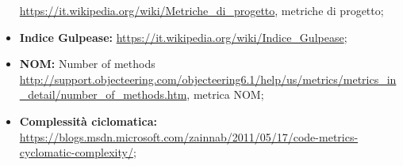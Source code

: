 \begin{itemize}
				  \url{https://it.wikipedia.org/wiki/Metriche_di_progetto}, metriche di progetto;
	\item \textbf{Indice Gulpease:}\newline
				 \url{https://it.wikipedia.org/wiki/Indice_Gulpease};
	\item \textbf{NOM:} Number of methods\newline
				  \url{http://support.objecteering.com/objecteering6.1/help/us/metrics/metrics_in_detail/number_of_methods.htm}, metrica NOM;
	\item \textbf{Complessità ciclomatica: }\newline
				 \url{https://blogs.msdn.microsoft.com/zainnab/2011/05/17/code-metrics-cyclomatic-complexity/};
		
\end{itemize}